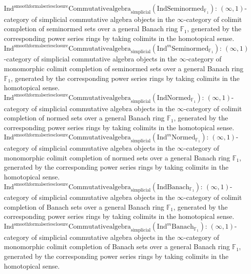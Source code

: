 \documentclass[11pt]{book}
\theoremstyle{definition}
\numberwithin{equation}{section}
\begin{document}
\noindent $\mathrm{Ind}^\text{smoothformalseriesclosure}\mathrm{Commutativealgebra}_{\mathrm{simplicial}}(\mathrm{Ind}\mathrm{Seminormed}_{\mathbb{F}_1})$: $(\infty,1)$-category of simplicial commutative algebra objects in the $\infty$-category of colimit completion of seminormed sets over a general Banach ring $\mathbb{F}_1$, generated by the corresponding power series rings by taking colimits in the homotopical sense. \\ 
\noindent $\mathrm{Ind}^\text{smoothformalseriesclosure}\mathrm{Commutativealgebra}_{\mathrm{simplicial}}(\mathrm{Ind}^m\mathrm{Seminormed}_{\mathbb{F}_1})$: $(\infty,1)$-category of simplicial commutative algebra objects in the $\infty$-category of monomorphic colimit completion of seminormed sets over a general Banach ring $\mathbb{F}_1$, generated by the corresponding power series rings by taking colimits in the homotopical sense. \\ 
\noindent $\mathrm{Ind}^\text{smoothformalseriesclosure}\mathrm{Commutativealgebra}_{\mathrm{simplicial}}(\mathrm{Ind}\mathrm{Normed}_{\mathbb{F}_1})$: $(\infty,1)$-category of simplicial commutative algebra objects in the $\infty$-category of colimit completion of normed sets over a general Banach ring $\mathbb{F}_1$, generated by the corresponding power series rings by taking colimits in the homotopical sense. \\ 
\noindent $\mathrm{Ind}^\text{smoothformalseriesclosure}\mathrm{Commutativealgebra}_{\mathrm{simplicial}}(\mathrm{Ind}^m\mathrm{Normed}_{\mathbb{F}_1})$: $(\infty,1)$-category of simplicial commutative algebra objects in the $\infty$-category of monomorphic colimit completion of normed sets over a general Banach ring $\mathbb{F}_1$, generated by the corresponding power series rings by taking colimits in the homotopical sense. \\ 
\noindent $\mathrm{Ind}^\text{smoothformalseriesclosure}\mathrm{Commutativealgebra}_{\mathrm{simplicial}}(\mathrm{Ind}\mathrm{Banach}_{\mathbb{F}_1})$: $(\infty,1)$-category of simplicial commutative algebra objects in the $\infty$-category of colimit completion of Banach sets over a general Banach ring $\mathbb{F}_1$, generated by the corresponding power series rings by taking colimits in the homotopical sense. \\ 
\noindent $\mathrm{Ind}^\text{smoothformalseriesclosure}\mathrm{Commutativealgebra}_{\mathrm{simplicial}}(\mathrm{Ind}^m\mathrm{Banach}_{\mathbb{F}_1})$: $(\infty,1)$-category of simplicial commutative algebra objects in the $\infty$-category of monomorphic colimit completion of Banach sets over a general Banach ring $\mathbb{F}_1$, generated by the corresponding power series rings by taking colimits in the homotopical sense. \\
\end{document}
